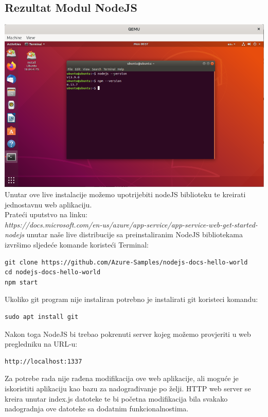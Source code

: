 \documentclass[12pt,vi]{mitthesis}
\begin{document}
\subsection*{Rezultat Modul NodeJS}
\includegraphics[width=\linewidth]{images/ModulNodeJSUbuntu.png} 
Unutar ove live instalacije možemo upotrijebiti nodeJS biblioteku te kreirati jednostavnu web aplikaciju.\\
Prateći uputstvo na linku:\\
\textit{https://docs.microsoft.com/en-us/azure/app-service/app-service-web-get-started-nodejs}
unutar naše live distribucije sa preinstaliranim NodeJS bibliotekama izvršimo sljedeće komande koristeći Terminal:
\begin{lstlisting}[style=BashInputStyle]
git clone https://github.com/Azure-Samples/nodejs-docs-hello-world
cd nodejs-docs-hello-world
npm start
\end{lstlisting}
Ukoliko git program nije instaliran potrebno je instalirati git koristeci komandu:
\begin{lstlisting}[style=BashInputStyle]
sudo apt install git
\end{lstlisting}
Nakon toga NodeJS bi trebao pokrenuti server kojeg možemo provjeriti u web pregledniku na URL-u:
\begin{lstlisting}[style=BashInputStyle]
http://localhost:1337
\end{lstlisting}
Za potrebe rada nije rađena modifikacija ove web aplikacije, ali moguće je iskoristiti aplikaciju kao bazu za nadograđivanje po želji. HTTP web server se kreira unutar index.js datoteke te bi početna modifikacija bila svakako nadogradnja ove datoteke sa dodatnim funkcionalnostima.\\
\end{document}
